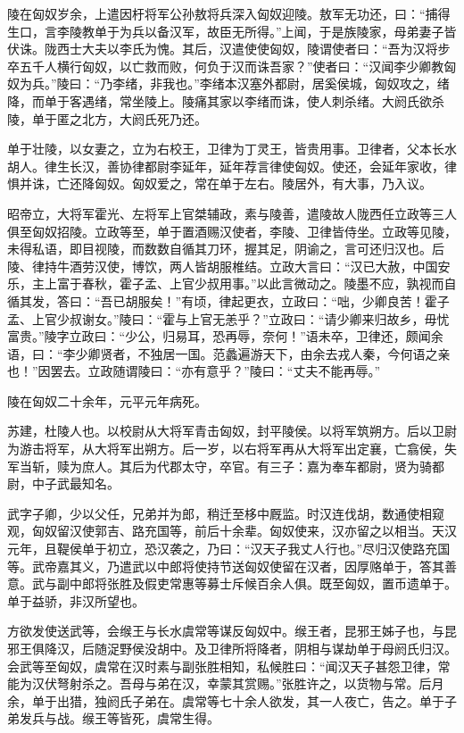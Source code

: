 \documentclass[]{article}
\begin{document}
陵在匈奴岁余，上遣因杅将军公孙敖将兵深入匈奴迎陵。敖军无功还，曰：``捕得生口，言李陵教单于为兵以备汉军，故臣无所得。''上闻，于是族陵家，母弟妻子皆伏诛。陇西士大夫以李氏为愧。其后，汉遣使使匈奴，陵谓使者曰：``吾为汉将步卒五千人横行匈奴，以亡救而败，何负于汉而诛吾家？''使者曰：``汉闻李少卿教匈奴为兵。''陵曰：``乃李绪，非我也。''李绪本汉塞外都尉，居奚侯城，匈奴攻之，绪降，而单于客遇绪，常坐陵上。陵痛其家以李绪而诛，使人刺杀绪。大阏氏欲杀陵，单于匿之北方，大阏氏死乃还。

单于壮陵，以女妻之，立为右校王，卫律为丁灵王，皆贵用事。卫律者，父本长水胡人。律生长汉，善协律都尉李延年，延年荐言律使匈奴。使还，会延年家收，律惧并诛，亡还降匈奴。匈奴爱之，常在单于左右。陵居外，有大事，乃入议。

昭帝立，大将军霍光、左将军上官桀辅政，素与陵善，遣陵故人陇西任立政等三人俱至匈奴招陵。立政等至，单于置酒赐汉使者，李陵、卫律皆侍坐。立政等见陵，未得私语，即目视陵，而数数自循其刀环，握其足，阴谕之，言可还归汉也。后陵、律持牛酒劳汉使，博饮，两人皆胡服椎结。立政大言曰：``汉已大赦，中国安乐，主上富于春秋，霍子孟、上官少叔用事。''以此言微动之。陵墨不应，孰视而自循其发，答曰：``吾已胡服矣！''有顷，律起更衣，立政曰：``咄，少卿良苦！霍子孟、上官少叔谢女。''陵曰：``霍与上官无恙乎？''立政曰：``请少卿来归故乡，毋忧富贵。''陵字立政曰：``少公，归易耳，恐再辱，奈何！''语未卒，卫律还，颇闻余语，曰：``李少卿贤者，不独居一国。范蠡遍游天下，由余去戎人秦，今何语之亲也！''因罢去。立政随谓陵曰：``亦有意乎？''陵曰：``丈夫不能再辱。''

陵在匈奴二十余年，元平元年病死。

苏建，杜陵人也。以校尉从大将军青击匈奴，封平陵侯。以将军筑朔方。后以卫尉为游击将军，从大将军出朔方。后一岁，以右将军再从大将军出定襄，亡翕侯，失军当斩，赎为庶人。其后为代郡太守，卒官。有三子：嘉为奉车都尉，贤为骑都尉，中子武最知名。

武字子卿，少以父任，兄弟并为郎，稍迁至栘中厩监。时汉连伐胡，数通使相窥观，匈奴留汉使郭吉、路充国等，前后十余辈。匈奴使来，汉亦留之以相当。天汉元年，且鞮侯单于初立，恐汉袭之，乃曰：``汉天子我丈人行也。''尽归汉使路充国等。武帝嘉其义，乃遣武以中郎将使持节送匈奴使留在汉者，因厚赂单于，答其善意。武与副中郎将张胜及假吏常惠等募士斥候百余人俱。既至匈奴，置币遗单于。单于益骄，非汉所望也。

方欲发使送武等，会缑王与长水虞常等谋反匈奴中。缑王者，昆邪王姊子也，与昆邪王俱降汉，后随浞野侯没胡中。及卫律所将降者，阴相与谋劫单于母阏氏归汉。会武等至匈奴，虞常在汉时素与副张胜相知，私候胜曰：``闻汉天子甚怨卫律，常能为汉伏弩射杀之。吾母与弟在汉，幸蒙其赏赐。''张胜许之，以货物与常。后月余，单于出猎，独阏氏子弟在。虞常等七十余人欲发，其一人夜亡，告之。单于子弟发兵与战。缑王等皆死，虞常生得。
\end{document}
